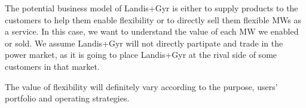 

The potential business model of Landis+Gyr is either to supply products to the customers to help them enable flexibility or to directly sell them flexible MWs as a service. In this case, we want to understand the value of each MW we enabled or sold. We assume Landis+Gyr will not directly partipate and trade in the power market, as it is going to place Landis+Gyr at the rival side of some customers in that market.

The value of flexibility will definitely vary according to the purpose, users' portfolio and operating strategies. 


